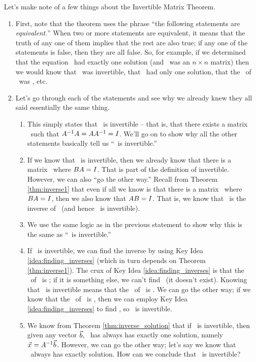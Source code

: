
Let's make note of a few things about the Invertible Matrix Theorem. 
\begin{enumerate}
\item		First, note that the theorem uses the phrase ``the following statements are {\em equivalent.}'' When two or more statements are equivalent, it means that the truth of any one of them implies that the rest are also true; if any one of the statements is false, then they are all false. So, for example, if we determined that the equation \ttaxo\ had exactly one solution (and \tta\ was an $n\times n$ matrix) then we would know that \tta\ was invertible, that \ttaxb\ had only one solution, that the \rref\ of \tta\ was \tti, etc.

\item		Let's go through each of the statements and see why we already knew they all said essentially the same thing.
	\begin{enumerate}
	\item		This simply states that \tta\ is invertible -- that is, that there exists a matrix \ttai\ such that $A^{-1}A = AA^{-1} = I$. We'll go on to show why all the other statements basically tell us ``\tta\ is invertible.''
	\item		If we know that \tta\ is invertible, then we already know that there is a matrix \ttb\ where $BA=I$. That is part of the definition of invertible. However, we can also ``go the other way.'' Recall from Theorem \ref{thm:inverse1} that even if all we know is that there is a matrix \ttb\ where $BA=I$, then we also know that $AB=I$. That is, we know that \ttb\ is the inverse of \tta\ (and hence \tta\ is invertible).
	\item		We use the same logic as in the previous statement to show why this is the same as ``\tta\ is invertible.''
	\item		If \tta\ is invertible, we can find the inverse by using Key Idea \ref{idea:finding_inverses} (which in turn depends on Theorem \ref{thm:inverse1}). The crux of Key Idea \ref{idea:finding_inverses} is that the \rref\ of \tta\ is \tti; if it is something else, we can't find \ttai\ (it doesn't exist). Knowing that \tta\ is invertible means that the \rref\ of \tta\ is \tti. We can go the other way; if we know that the \rref\ of \tta\ is \tti, then we can employ Key Idea \ref{idea:finding_inverses} to find \ttai, so \tta\ is invertible.
	\item		We know from Theorem \ref{thm:inverse_solution} that if \tta\ is invertible, then given any vector $\vec{b}$, \ttaxb\ has always has exactly one solution, namely $\vec{x_{}}=A^{-1}\vec{b}$. However, we can go the other way; let's say we know that \ttaxb\ always has exactly solution. How can we conclude that \tta\ is invertible?
	

\end{enumerate}
\end{enumerate}
